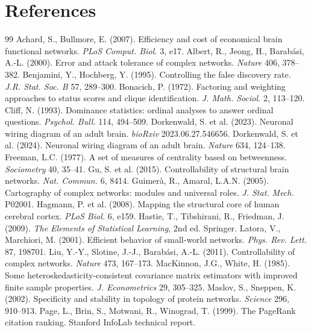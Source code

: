 \documentclass[11pt,a4paper]{article}
\begin{document}
\section{References}
\begin{thebibliography}{99}\small
{} Achard, S., Bullmore, E. (2007). Efficiency and cost of economical brain functional networks. \emph{PLoS Comput. Biol.} 3, e17.
 Albert, R., Jeong, H., Barab\'asi, A.-L. (2000). Error and attack tolerance of complex networks. \emph{Nature} 406, 378--382.
 Benjamini, Y., Hochberg, Y. (1995). Controlling the false discovery rate. \emph{J.R. Stat. Soc. B} 57, 289--300.
 Bonacich, P. (1972). Factoring and weighting approaches to status scores and clique identification. \emph{J. Math. Sociol.} 2, 113--120.
 Cliff, N. (1993). Dominance statistics: ordinal analyses to answer ordinal questions. \emph{Psychol. Bull.} 114, 494--509.
 Dorkenwald, S. et al. (2023). Neuronal wiring diagram of an adult brain. \emph{bioRxiv} 2023.06.27.546656.
 Dorkenwald, S. et al. (2024). Neuronal wiring diagram of an adult brain. \emph{Nature} 634, 124--138.
 Freeman, L.C. (1977). A set of measures of centrality based on betweenness. \emph{Sociometry} 40, 35--41.
 Gu, S. et al. (2015). Controllability of structural brain networks. \emph{Nat. Commun.} 6, 8414.
 Guimer\`a, R., Amaral, L.A.N. (2005). Cartography of complex networks: modules and universal roles. \emph{J. Stat. Mech.} P02001.
 Hagmann, P. et al. (2008). Mapping the structural core of human cerebral cortex. \emph{PLoS Biol.} 6, e159.
 Hastie, T., Tibshirani, R., Friedman, J. (2009). \emph{The Elements of Statistical Learning}, 2nd ed. Springer.
 Latora, V., Marchiori, M. (2001). Efficient behavior of small-world networks. \emph{Phys. Rev. Lett.} 87, 198701.
 Liu, Y.-Y., Slotine, J.-J., Barab\'asi, A.-L. (2011). Controllability of complex networks. \emph{Nature} 473, 167--173.
 MacKinnon, J.G., White, H. (1985). Some heteroskedasticity-consistent covariance matrix estimators with improved finite sample properties. \emph{J. Econometrics} 29, 305--325.
 Maslov, S., Sneppen, K. (2002). Specificity and stability in topology of protein networks. \emph{Science} 296, 910--913.
 Page, L., Brin, S., Motwani, R., Winograd, T. (1999). The PageRank citation ranking. Stanford InfoLab technical report.

\end{thebibliography}
\end{document}
